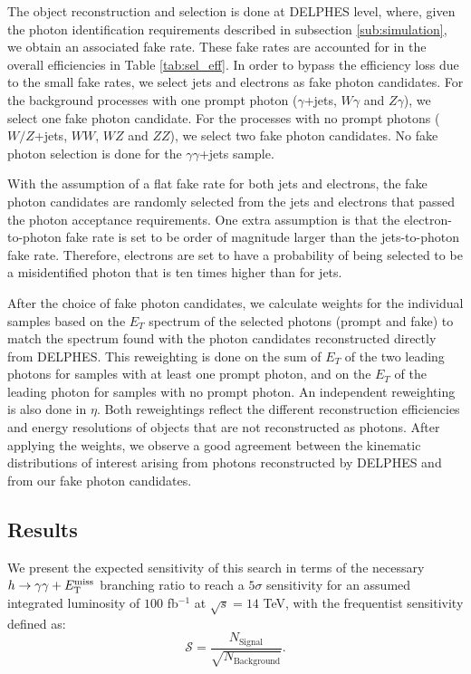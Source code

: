The object reconstruction and selection is done at DELPHES level, where, given the photon identification requirements described in subsection \ref{sub:simulation}, we obtain an associated fake rate. These fake rates are accounted for in the overall efficiencies in Table \ref{tab:sel_eff}. In order to bypass the efficiency loss due to the small fake rates, we select jets and electrons as fake photon candidates. For the background processes with one prompt photon ($\gamma$+jets, $W\gamma$ and $Z\gamma$), we select one fake photon candidate. For the processes with no prompt photons ($W/Z$+jets, $WW$, $WZ$ and $ZZ$), we select two fake photon candidates. No fake photon selection is done for the $\gamma\gamma$+jets sample.

With the assumption of a flat fake rate for both jets and electrons, the fake photon candidates are randomly selected from the jets and electrons that passed the photon acceptance requirements. One extra assumption is that the electron-to-photon fake rate is set to be order of magnitude larger than the jets-to-photon fake rate. Therefore, electrons are set to have a probability of being selected to be a misidentified photon that is ten times higher than for jets.

After the choice of fake photon candidates, we calculate weights for the individual samples based on the $E_{T}$ spectrum of the selected photons (prompt and fake) to match the spectrum found with the photon candidates reconstructed directly from DELPHES. This reweighting is done on the sum of $E_{T}$ of the two leading photons for samples with at least one prompt photon, and on the $E_{T}$ of the leading photon for samples with no prompt photon. An independent reweighting is also done in $\eta$. Both reweightings reflect the different reconstruction efficiencies and energy resolutions of objects that are not reconstructed as photons. After applying the weights, we observe a good agreement between the kinematic distributions of interest arising from photons reconstructed by DELPHES and from our fake photon candidates.

\subsection{Results}

We present the expected sensitivity of this search in terms of the necessary $h\rightarrow\gamma\gamma+E_{\mathrm{T}}^{\text{miss}}$ branching ratio to reach a $5\sigma$ sensitivity for an assumed integrated luminosity of $100$ fb$^{-1}$ at $\sqrt{s} = 14$ TeV, with the frequentist sensitivity defined as:
%
\begin{equation}
\mathcal{S} = \frac{N_\text{Signal}}{\sqrt{N_\text{Background}}}.
\end{equation}

